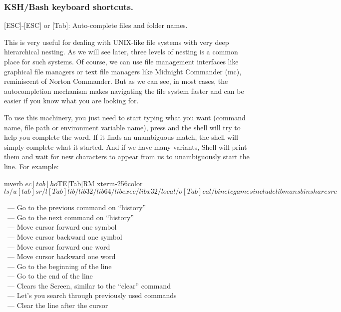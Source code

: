 \subsubsection*{KSH/Bash keyboard shortcuts.}

[ESC]-[ESC] or [Tab]: Auto-complete files and folder names.

This is very useful for dealing with UNIX-like file systems with very
deep hierarchical nesting. As we will see later, three levels of nesting
is a common place for such systems. Of course, we can use file management
interfaces like graphical file managers or text file managers like
Midnight Commander (mc), reminiscent of Norton Commander. But as we can
see, in most cases, the autocompletion mechanism makes navigating the
file system faster and can be easier if you know what you are looking for.

To use this machinery, you just need to start typing what you want
(command name, file path or environment variable name), press \struct{[Tab]}
and the shell will try to help you complete the word. If it finds an
unambiguous match, the shell will simply complete what it started. And if
we have many variants, Shell will print them and wait for new characters
to appear from us to unambiguously start the line. For example:
\begin{code}{mverb}
$ ec[tab]ho $TE[Tab]RM
xterm-256color
$ ls /u[tab]sr/l[Tab]
lib/ lib32/ lib64/ libexec/ libx32/ local/ 
o[Tab]cal/
bin etc games include lib man sbin share src
$
\end{code}

\noindent
\struct{\tt [Ctrl]-[P]}~--- Go to the previous command on ``history''\\
\struct{\tt [Ctrl]-[N]}~--- Go to the next command on ``history''\\
\struct{\tt [Ctrl]-[F]}~--- Move cursor forward one symbol\\
\struct{\tt [Ctrl]-[B]}~--- Move cursor backward one symbol\\
\struct{\tt [Meta]-[F]}~--- Move cursor forward one word\\
\struct{\tt [Meta]-[B]}~--- Move cursor backward one word\\
\struct{\tt [Ctrl]-[A]}~--- Go to the beginning of the line\\
\struct{\tt [Ctrl]-[E]}~--- Go to the end of the line\\
\struct{\tt [Ctrl]-[L]}~--- Clears the Screen, similar to the ``clear'' command\\
\struct{\tt [Ctrl]-[R]}~--- Let’s you search through previously used commands\\
\struct{\tt [Ctrl]-[K]}~--- Clear the line after the cursor

